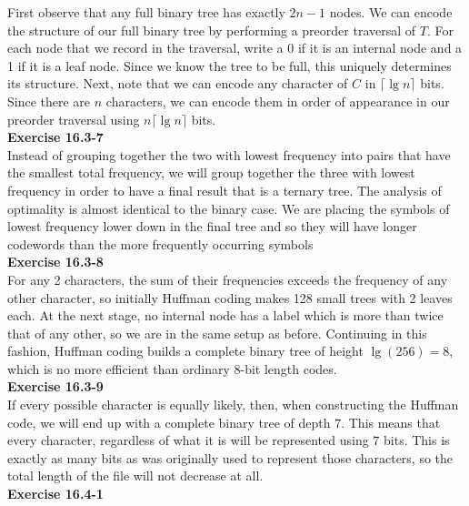 \documentclass{article}
\begin{document}
First observe that any full binary tree has exactly $2n-1$ nodes.  We can encode the structure of our full binary tree by performing a preorder traversal of $T$.  For each node that we record in the traversal, write a 0 if it is an internal node and a 1 if it is a leaf node. Since we know the tree to be full, this uniquely determines its structure.  Next, note that we can encode any character of $C$ in $\lceil \lg n \rceil$ bits. Since there are $n$ characters, we can encode them in order of appearance in our preorder traversal using $n\lceil \lg n \rceil$ bits. \\

\noindent\textbf{Exercise 16.3-7}\\

Instead of grouping together the two with lowest frequency into pairs that have the smallest total frequency, we will group together the three with lowest frequency in order to have a final result that is a ternary tree. The analysis of optimality is almost identical to the binary case. We are placing the symbols of lowest frequency lower down in the final tree and so they will have longer codewords than the more frequently occurring symbols\\

\noindent\textbf{Exercise 16.3-8}\\

For any 2 characters, the sum of their frequencies exceeds the frequency of any other character, so initially Huffman coding makes 128 small trees with 2 leaves each.  At the next stage, no internal node has a label which is more than twice that of any other, so we are in the same setup as before.  Continuing in this fashion, Huffman coding builds a complete binary tree of height $\lg(256) = 8$, which is no more efficient than ordinary 8-bit length codes. \\

\noindent\textbf{Exercise 16.3-9}\\

If every possible character is equally likely, then, when constructing the Huffman code, we will end up with a complete binary tree of depth $7$. This means that every character, regardless of what it is will be represented using $7$ bits. This is exactly as many bits as was originally used to represent those characters, so the total length of the file will not decrease at all.\\

\noindent\textbf{Exercise 16.4-1}\\
\end{document}
